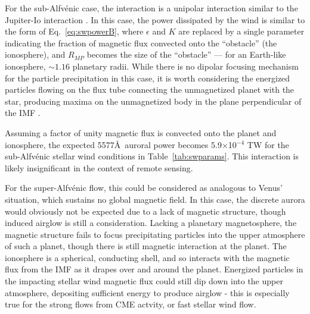 \documentclass{emulateapj}
\newcommand{\XXX}[1]{#1}      %
\begin{document}
\XXX{For the sub-Alfv\'{e}nic case, the interaction is a unipolar interaction similar to the Jupiter-Io interaction \citep{Zarka2007}. In this case, the power dissipated by the wind is similar to the form of Eq.~\ref{eq:swpowerB}, where $\epsilon$ and $K$ are replaced by a single parameter indicating the fraction of magnetic flux convected onto the ``obstacle'' (the ionosphere), and $R_{MP}$ becomes the size of the ``obstacle'' --- for an Earth-like ionosphere, ${\sim}1.16$ planetary radii. While there is no dipolar focusing mechanism for the particle precipitation in this case, it is worth considering the energized particles flowing on the flux tube connecting the unmagnetized planet with the star, producing maxima on the unmagnetized body in the plane perpendicular of the IMF \citep[see, e.g.,][]{Saur2000,Saur2004}.} 

\XXX{Assuming a factor of unity magnetic flux is convected onto the planet and ionosphere, the expected 5577\AA\ auroral power becomes 5.9$\times$10$^{-4}$ TW for the sub-Alfv\'{e}nic stellar wind conditions in Table~\ref{tab:swparams}. This interaction is likely insignificant in the context of remote sensing.}

\XXX{For the super-Alfv\'{e}nic flow, this could be considered as analogous to Venus' situation, which sustains no global magnetic field. In this case, the discrete aurora would obviously not be expected due to a lack of magnetic structure, though induced airglow is still a consideration. Lacking a planetary magnetosphere, the magnetic structure fails to focus precipitating particles into the upper atmosphere of such a planet, though there is still magnetic interaction at the planet. The ionosphere is a spherical, conducting shell, and so interacts with the magnetic flux from the IMF as it drapes over and around the planet. Energized particles in the impacting stellar wind magnetic flux could still dip down into the upper atmosphere, depositing sufficient energy to produce airglow - this is especially true for the strong flows from CME actvity, or fast stellar wind flow.} 
\end{document}
